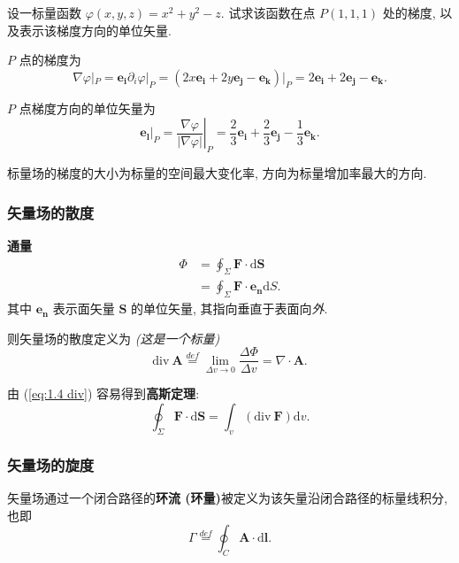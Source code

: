 \begin{exampleprob}[求梯度和单位矢量]
    设一标量函数 $\varphi(x,y,z)=x^2+y^2-z$. 试求该函数在点 $P(1,1,1)$ 处的梯度, 以及表示该梯度方向的单位矢量.

    \begin{solution}
        $P$ 点的梯度为
        \begin{equation*}
            \nabla\varphi|_P=\bm{e_i}\partial_i\varphi|_P=(2x\bm{e_i}+2y\bm{e_j}-\bm{e_k})|_P=2\bm{e_i}+2\bm{e_j}-\bm{e_k}.
        \end{equation*}

        $P$ 点梯度方向的单位矢量为
        \begin{equation*}
            \bm{e_l}|_P=\left.\frac{\nabla\varphi}{|\nabla\varphi|}\right|_P=\frac{2}{3}\bm{e_i}+\frac{2}{3}\bm{e_j}-\frac{1}{3}\bm{e_k}.
        \end{equation*}
    \end{solution}
\end{exampleprob}

标量场的梯度的大小为标量的空间最大变化率, 方向为标量增加率最大的方向.

\subsubsection{矢量场的散度}
\textbf{通量}
\begin{equation}
    \begin{aligned}
        \Phi & =\oint_{\Sigma}\bm{F}\cdot\mathrm{d}\bm{S}     \\
             & =\oint_{\Sigma}\bm{F}\cdot\bm{e_n}\mathrm{d}S.
    \end{aligned}
\end{equation}
其中 $\bm{e_n}$ 表示面矢量 $\bm{S}$ 的单位矢量, 其指向垂直于表面向\textit{外}.

则矢量场的散度定义为 \textit{(这是一个标量)}
\begin{equation} \label{eq:1.4 div}
    \mathrm{div}\ \bm{A}\stackrel{def}{=}\lim_{\Delta v\rightarrow 0}\frac{\Delta\Phi}{\Delta v}=\nabla\cdot\bm{A}.
\end{equation}

由 (\ref{eq:1.4 div}) 容易得到\textbf{高斯定理}:
\begin{equation} \label{eq:1.4 gauss}
    \oint_\Sigma\bm{F}\cdot\mathrm{d}\bm{S}=\int_{v}(\mathrm{div}\ \bm{F})\mathrm{d}v.
\end{equation}

\subsubsection{矢量场的旋度}
矢量场通过一个闭合路径的\textbf{环流 (环量)}被定义为该矢量沿闭合路径的标量线积分, 也即
\begin{equation}
    \Gamma\stackrel{def}{=}\oint_C\bm{A}\cdot\mathrm{d}\bm{l}.
\end{equation}

